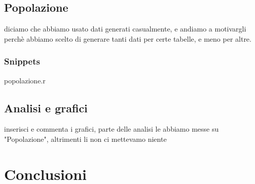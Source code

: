 \documentclass[11pt]{article}
\begin{document}
\subsection{Popolazione}
diciamo che abbiamo usato dati generati casualmente, e andiamo a motivargli perchè abbiamo scelto di generare 
tanti dati per certe tabelle, e meno per altre.
\subsubsection{Snippets}
popolazione.r
\subsection{Analisi e grafici}
inserisci e commenta i grafici, parte delle analisi le abbiamo messe su "Popolazione", altrimenti li non ci mettevamo niente

\section{Conclusioni}
\end{document}
